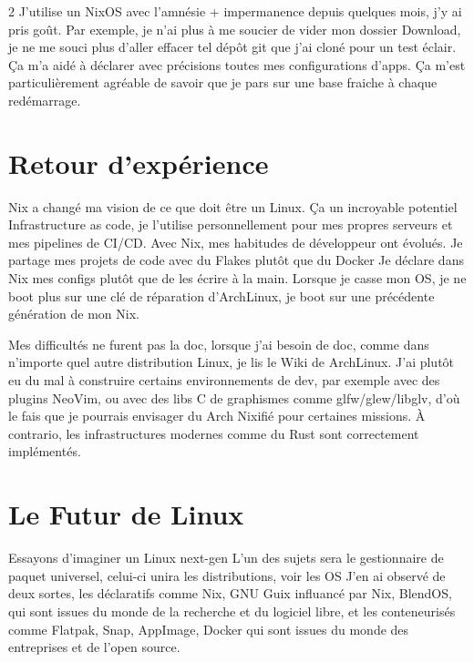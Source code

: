 \documentclass[a4paper,11pt]{article}
\begin{document}
\begin{blogmain}
\begin{multicols}{2}
J'utilise un NixOS avec l'amnésie + impermanence depuis quelques mois, j'y ai pris goût. Par exemple, je n'ai plus à me soucier de vider mon dossier Download, je ne me souci plus d'aller effacer tel dépôt git que j'ai cloné pour un test éclair. Ça m'a aidé à déclarer avec précisions toutes mes configurations d'apps. Ça m'est particulièrement agréable de savoir que je pars sur une base fraiche à chaque redémarrage.
  
 
\end{multicols}

\section{Retour d'expérience}
Nix a changé ma vision de ce que doit être un Linux.
Ça un incroyable potentiel Infrastructure as code, je l'utilise personnellement pour mes propres serveurs et mes pipelines de CI/CD.
Avec Nix, mes habitudes de développeur ont évolués.
Je partage mes projets de code avec du Flakes plutôt que du Docker
Je déclare dans Nix mes configs plutôt que de les écrire à la main.
Lorsque je casse mon OS, je ne boot plus sur une clé de réparation d'ArchLinux, je boot sur une précédente génération de mon Nix.

Mes difficultés ne furent pas la doc, lorsque j'ai besoin de doc, comme dans n'importe quel autre distribution Linux, je lis le Wiki de ArchLinux.
J'ai plutôt eu du mal à construire certains environnements de dev, par exemple avec des plugins NeoVim, ou avec des libs C de graphismes comme glfw/glew/libglv, d'où le fais que je pourrais envisager du Arch Nixifié pour certaines missions.
À contrario, les infrastructures modernes comme du Rust sont correctement implémentés.


\section{Le Futur de Linux}

Essayons d'imaginer un Linux next-gen
L'un des sujets sera le gestionnaire de paquet universel, celui-ci unira les distributions, voir les OS
J'en ai observé de deux sortes, les déclaratifs comme Nix, GNU Guix influancé par Nix, BlendOS, qui sont issues du monde de la recherche et du logiciel libre, et les conteneurisés comme Flatpak, Snap, AppImage, Docker qui sont issues du monde des entreprises et de l'open source.


\end{blogmain}
\end{document}
